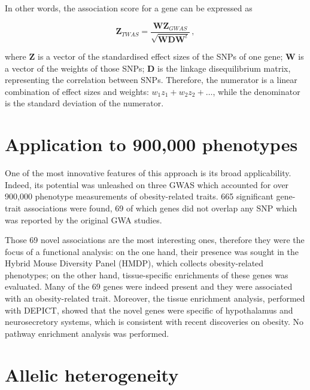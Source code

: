 \documentclass[../main.tex]{subfiles}
\begin{document}
In other words, the association score for a gene can be expressed as

\begin{equation}
	\label{eq:summary_twas}
	\mathbf{Z}_{TWAS} = \frac{\mathbf{W} \mathbf{Z}_{GWAS}}
		{\sqrt{\mathbf{W} \mathbf{D} \mathbf{W}^t}}\,,
\end{equation}

where $\mathbf{Z}$ is a vector of the standardised effect sizes of the 
\cis SNPs of one gene; $\mathbf{W}$ is a vector of the weights of those 
SNPs; $\mathbf{D}$ is the linkage disequilibrium matrix, representing 
the correlation between SNPs. Therefore, the numerator is a linear 
combination of effect sizes and weights: $w_1 z_1 + w_2 z_2 + \ldots$, 
while the denominator is the standard deviation of the numerator.

\section{Application to 900,000 phenotypes}

One of the most innovative features of this approach is its broad 
applicability. Indeed, its potential was unleashed on three GWAS which 
accounted for over 900,000 phenotype measurements of obesity-related 
traits. 665 
significant gene-trait associations were found, 69 of which genes did 
not overlap any SNP which was reported by the original GWA studies.

Those 69 novel associations are the most interesting ones, therefore 
they were the focus of a functional analysis: on the one hand, their 
presence was sought in the Hybrid Mouse Diversity Panel (HMDP), which 
collects obesity-related phenotypes; on the other hand, tissue-specific 
enrichments of these genes was evaluated. Many of the 69 genes were 
indeed present and they were associated with an obesity-related trait. 
Moreover, the tissue enrichment analysis, performed with DEPICT, showed 
that the novel genes were specific of hypothalamus and neurosecretory 
systems, which is consistent with recent discoveries on obesity. No 
pathway enrichment analysis was performed.

\section{Allelic heterogeneity}
\end{document}
